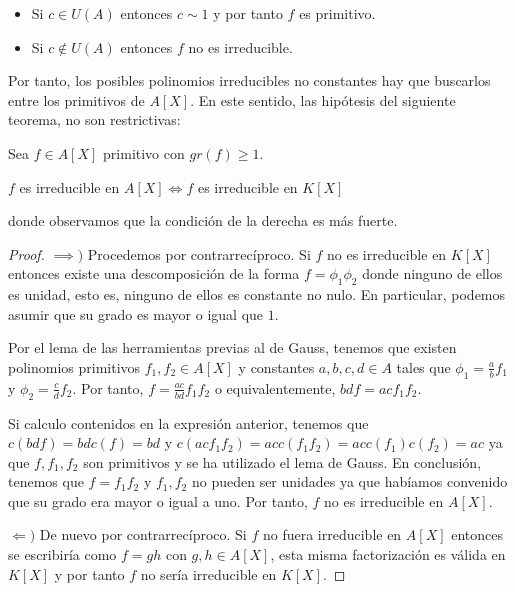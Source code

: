 \begin{itemize}
\item Si $c \in U(A)$ entonces $c \sim 1$ y por tanto $f$ es primitivo. 
\item Si $c \notin U(A)$ entonces $f$ no es irreducible. 
\end{itemize}

Por tanto, los posibles polinomios irreducibles no constantes hay que buscarlos entre los primitivos de $A[X]$. En este sentido, las hipótesis del siguiente teorema, no son restrictivas:

\begin{theorem}
Sea $f \in A[X]$ primitivo con $gr(f) \ge 1$. 

$f$ es irreducible en $A[X] \iff f$ es irreducible en $K[X]$

donde observamos que la condición de la derecha es más fuerte. 
\end{theorem}
\begin{proof}
$\implies)$ Procedemos por contrarrecíproco. Si $f$ no es irreducible en $K[X]$ entonces existe una descomposición de la forma $f = \phi_1 \phi_2$ donde ninguno de ellos es unidad, esto es, ninguno de ellos es constante no nulo. En particular, podemos asumir que su grado es mayor o igual que $1$. 

Por el lema de las herramientas previas al de Gauss, tenemos que existen polinomios primitivos $f_1,f_2 \in A[X]$ y constantes $a,b,c,d \in A$ tales que $\phi_1 = \frac{a}{b} f_1$ y $\phi_2 = \frac{c}{d} f_2$. Por tanto, $f = \frac{ac}{bd} f_1 f_2$ o equivalentemente, $bdf = acf_1f_2$. 

Si calculo contenidos en la expresión anterior, tenemos que $c(bdf) = bd c(f) = bd$ y $c(acf_1f_2) = ac c(f_1f_2) = ac c(f_1)c(f_2) = ac$ ya que $f,f_1,f_2$ son primitivos y se ha utilizado el lema de Gauss. En conclusión, tenemos que $f = f_1 f_2$ y $f_1,f_2$ no pueden ser unidades ya que habíamos convenido que su grado era mayor o igual a uno. Por tanto, $f$ no es irreducible en $A[X]$.

$\Leftarrow)$ De nuevo por contrarrecíproco. Si $f$ no fuera irreducible en $A[X]$ entonces se escribiría como $f = gh$ con $g,h \in A[X]$, esta misma factorización es válida en $K[X]$ y por tanto $f$ no sería irreducible en $K[X]$.
\end{proof}

